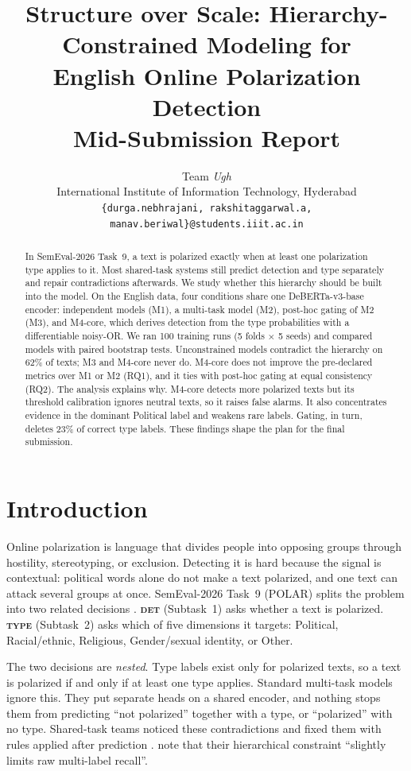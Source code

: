 \documentclass[11pt]{article}
\title{Structure over Scale: Hierarchy-Constrained Modeling for\\English Online Polarization Detection\\[0.3em]
\large Mid-Submission Report}
\author{Team \textit{Ugh} \\
  International Institute of Information Technology, Hyderabad \\
  \texttt{\{durga.nebhrajani, rakshitaggarwal.a, manav.beriwal\}@students.iiit.ac.in}}
\newcommand{\DET}{\textsc{det}}
\newcommand{\TYPE}{\textsc{type}}
\begin{document}
\maketitle

\begin{abstract}
In SemEval-2026 Task~9, a text is polarized exactly when at least one
polarization type applies to it. Most shared-task systems still predict
detection and type separately and repair contradictions afterwards. We study
whether this hierarchy should be built into the model. On the English data,
four conditions share one DeBERTa-v3-base encoder: independent models (M1),
a multi-task model (M2), post-hoc gating of M2 (M3), and M4-core, which
derives detection from the type probabilities with a differentiable noisy-OR.
We ran 100 training runs (5 folds $\times$ 5 seeds) and compared models with
paired bootstrap tests. Unconstrained models contradict the hierarchy on 62\%
of texts; M3 and M4-core never do. M4-core does not improve the pre-declared
metrics over M1 or M2 (RQ1), and it ties with post-hoc gating at equal
consistency (RQ2). The analysis explains why. M4-core detects more polarized
texts but its threshold calibration ignores neutral texts, so it raises false
alarms. It also concentrates evidence in the dominant Political label and
weakens rare labels. Gating, in turn, deletes 23\% of correct type labels.
These findings shape the plan for the final submission.
\end{abstract}

\section{Introduction}

Online polarization is language that divides people into opposing groups
through hostility, stereotyping, or exclusion. Detecting it is hard because
the signal is contextual: political words alone do not make a text
polarized, and one text can attack several groups at once.
SemEval-2026 Task~9 (POLAR) splits the problem into two related decisions
\citep{naseem-etal-2026-semeval}. \textbf{\DET{}} (Subtask~1) asks whether a
text is polarized. \textbf{\TYPE{}} (Subtask~2) asks which of five
dimensions it targets: Political, Racial/ethnic, Religious, Gender/sexual
identity, or Other.

The two decisions are \emph{nested}. Type labels exist only for polarized
texts, so a text is polarized if and only if at least one type applies.
Standard multi-task models ignore this. They put separate heads on a shared
encoder, and nothing stops them from predicting ``not polarized'' together
with a type, or ``polarized'' with no type. Shared-task teams noticed these
contradictions \citep{guo-chang-2026-yeze} and fixed them with rules applied
after prediction \citep{lin-etal-2026-nycu,maharjan-etal-2026-sagarmatha}.
\citet{maharjan-etal-2026-sagarmatha} note that their hierarchical
constraint ``slightly limits raw multi-label recall''.
\end{document}
